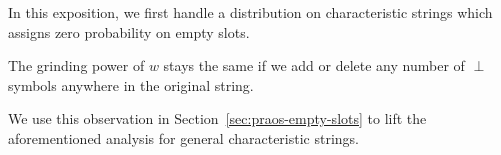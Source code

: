 In this exposition, 
we first handle a distribution 
on characteristic strings 
which assigns zero probability on empty slots. 

\begin{observation}\label{obs:empty-slot-praos}
  The grinding power of $w$ stays the same 
  if we add or delete any number of $\perp$ symbols 
  anywhere in the original string.   
\end{observation}
\noindent
We use this observation in Section~\ref{sec:praos-empty-slots} 
to lift the aforementioned analysis for general characteristic strings.

















